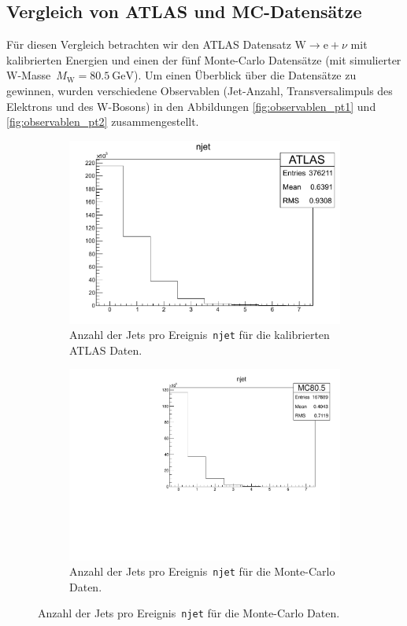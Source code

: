 \documentclass[11pt, a4paper]{article}
\numberwithin{equation}{section}
\begin{document}
\subsection{Vergleich von ATLAS und MC-Datensätze}
Für diesen Vergleich betrachten wir den ATLAS Datensatz $\mathrm{W} \rightarrow \mathrm{e} + \nu$ mit kalibrierten Energien und einen der fünf Monte-Carlo Datensätze (mit simulierter W-Masse~$M_\mathrm{W} = \SI{80.5}{\GeV}$).
Um einen Überblick über die Datensätze zu gewinnen, wurden verschiedene Observablen (Jet-Anzahl, Transversalimpuls des Elektrons und des W-Bosons) in den Abbildungen \ref{fig:observablen_pt1} und \ref{fig:observablen_pt2} zusammengestellt.    \begin{figure}
	\centering
	\begin{subfigure}{.49\textwidth}
		\centering
		\includegraphics[width=.7\textwidth]{./data/root/wmass/exercise1/ATLAS_njet.pdf}
		\caption{Anzahl der Jets pro Ereignis~\texttt{njet} für die kalibrierten ATLAS Daten.}
		\label{fig:atlas_njet}
	\end{subfigure}
	\begin{subfigure}{.49\textwidth}
		\centering
		\includegraphics[width=.7\textwidth]{./data/root/wmass/exercise1/MC_njet.pdf}
		\caption{Anzahl der Jets pro Ereignis~\texttt{njet} für die Monte-Carlo Daten.}

\end{subfigure}
\end{figure}
\end{document}
